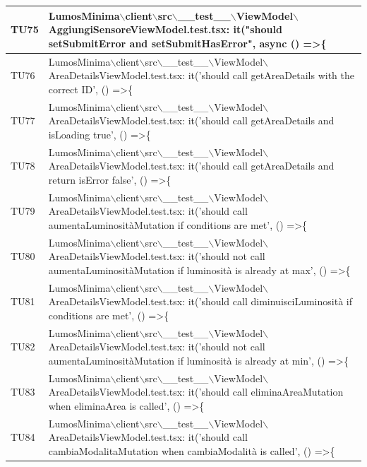 \documentclass[12pt]{article}
\begin{document}
\begin{scriptsize}
\begin{xltabular}{\linewidth}{|>{\hsize}X|X|}
	TU75 & LumosMinima$\backslash$client$\backslash$src$\backslash$\_\_test\_\_$\backslash$ViewModel$\backslash$AggiungiSensoreViewModel.test.tsx: it("should setSubmitError and setSubmitHasError", async () =\textgreater \{ \\ \hline
	TU76 & LumosMinima$\backslash$client$\backslash$src$\backslash$\_\_test\_\_$\backslash$ViewModel$\backslash$AreaDetailsViewModel.test.tsx: it('should call getAreaDetails with the correct ID', () =\textgreater \{ \\ \hline
	TU77 & LumosMinima$\backslash$client$\backslash$src$\backslash$\_\_test\_\_$\backslash$ViewModel$\backslash$AreaDetailsViewModel.test.tsx: it('should call getAreaDetails and isLoading true', () =\textgreater \{ \\ \hline
	TU78 & LumosMinima$\backslash$client$\backslash$src$\backslash$\_\_test\_\_$\backslash$ViewModel$\backslash$AreaDetailsViewModel.test.tsx: it('should call getAreaDetails and return isError false', () =\textgreater \{ \\ \hline
	TU79 & LumosMinima$\backslash$client$\backslash$src$\backslash$\_\_test\_\_$\backslash$ViewModel$\backslash$AreaDetailsViewModel.test.tsx: it('should call aumentaLuminositàMutation if conditions are met', () =\textgreater \{ \\ \hline
	TU80 & LumosMinima$\backslash$client$\backslash$src$\backslash$\_\_test\_\_$\backslash$ViewModel$\backslash$AreaDetailsViewModel.test.tsx: it('should not call aumentaLuminositàMutation if luminosità is already at max', () =\textgreater \{ \\ \hline
	TU81 & LumosMinima$\backslash$client$\backslash$src$\backslash$\_\_test\_\_$\backslash$ViewModel$\backslash$AreaDetailsViewModel.test.tsx: it('should call diminuisciLuminosità if conditions are met', () =\textgreater \{ \\ \hline
	TU82 & LumosMinima$\backslash$client$\backslash$src$\backslash$\_\_test\_\_$\backslash$ViewModel$\backslash$AreaDetailsViewModel.test.tsx: it('should not call aumentaLuminositàMutation if luminosità is already at min', () =\textgreater \{ \\ \hline
	TU83 & LumosMinima$\backslash$client$\backslash$src$\backslash$\_\_test\_\_$\backslash$ViewModel$\backslash$AreaDetailsViewModel.test.tsx: it('should call eliminaAreaMutation when eliminaArea is called', () =\textgreater \{ \\ \hline
	TU84 & LumosMinima$\backslash$client$\backslash$src$\backslash$\_\_test\_\_$\backslash$ViewModel$\backslash$AreaDetailsViewModel.test.tsx: it('should call cambiaModalitaMutation when cambiaModalità is called', () =\textgreater \{ \\ \hline

\end{xltabular}
\end{scriptsize}
\end{document}
